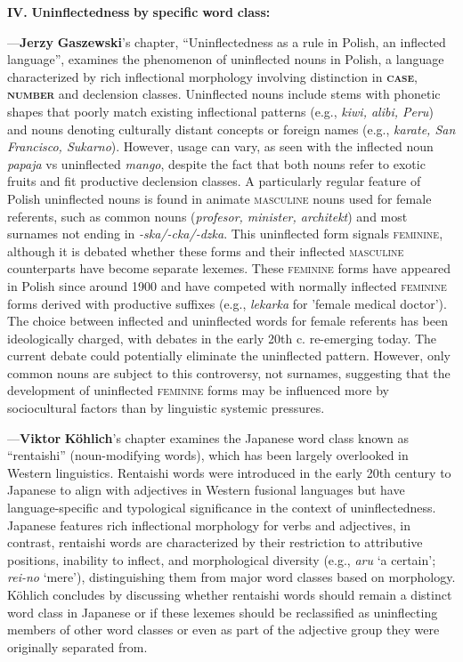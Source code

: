 \documentclass[output=paper]{langscibook}
\begin{document}
\textbf{IV.} \textbf{Uninflectedness} \textbf{by} \textbf{specific} \textbf{word} \textbf{class:} 

—\textbf{Jerzy} \textbf{Gaszewski}{}'s chapter, “Uninflectedness as a rule in Polish, an inflected language”, examines the phenomenon of uninflected nouns in Polish, a language characterized by rich inflectional morphology involving distinction in \textbf{\textsc{case}}, \textbf{\textsc{number}} and declension classes. Uninflected nouns include stems with phonetic shapes that poorly match existing inflectional patterns (e.g., \textit{kiwi, alibi, Peru}) and nouns denoting culturally distant concepts or foreign names (e.g., \textit{karate, San Francisco, Sukarno}). However, usage can vary, as seen with the inflected noun \textit{papaja} vs uninflected \textit{mango}, despite the fact that both nouns refer to exotic fruits and fit productive declension classes. A particularly regular feature of Polish uninflected nouns is found in animate \textsc{masculine} nouns used for female referents, such as common nouns (\textit{profesor, minister, architekt}) and most surnames not ending in \textit{{}-ska/-cka/-dzka}. This uninflected form signals \textsc{feminine}, although it is debated whether these forms and their inflected \textsc{masculine} counterparts have become separate lexemes. These \textsc{feminine} forms have appeared in Polish since around 1900 and have competed with normally inflected \textsc{feminine} forms derived with productive suffixes (e.g., \textit{lekarka} for 'female medical doctor'). The choice between inflected and uninflected words for female referents has been ideologically charged, with debates in the early 20th c. re-emerging today. The current debate could potentially eliminate the uninflected pattern. However, only common nouns are subject to this controversy, not surnames, suggesting that the development of uninflected \textsc{feminine} forms may be influenced more by sociocultural factors than by linguistic systemic pressures.

—\textbf{Viktor} \textbf{Köhlich}{}'s chapter examines the Japanese word class known as “rentaishi” (noun-modifying words), which has been largely overlooked in Western linguistics. Rentaishi words were introduced in the early 20th century to Japanese to align with adjectives in Western fusional languages but have language-specific and typological significance in the context of uninflectedness. Japanese features rich inflectional morphology for verbs and adjectives, in contrast, rentaishi words are characterized by their restriction to attributive positions, inability to inflect, and morphological diversity (e.g., \textit{aru} ‘a certain’; \textit{rei-no} ‘mere’), distinguishing them from major word classes based on morphology. Köhlich concludes by discussing whether rentaishi words should remain a distinct word class in Japanese or if these lexemes should be reclassified as uninflecting members of other word classes or even as part of the adjective group they were originally separated from. 
\end{document}

